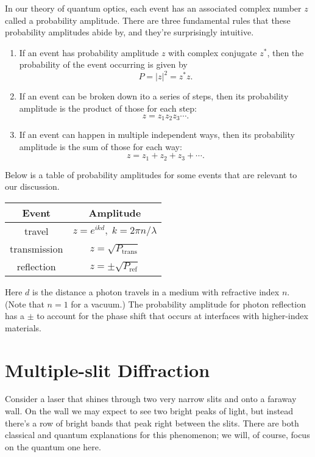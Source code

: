 \documentclass[../p051main.tex]{subfiles}
\begin{document}
In our theory of quantum optics, each event has an associated complex number $z$ called a probability amplitude.
There are three fundamental rules that these probability amplitudes abide by, and they're surprisingly intuitive.
\begin{enumerate}
    \item If an event has probability amplitude $z$ with complex conjugate $z^*$, then the probability of the event occurring is given by
    \[ P = |z|^2 = z^*z. \]

    \item If an event can be broken down ito a series of steps, then its probability amplitude is the product of those for each step:
    \[ z = z_1 z_2 z_3 \cdots. \]

    \item If an event can happen in multiple independent ways, then its probability amplitude is the sum of those for each way:
    \[ z = z_1 + z_2 + z_3 + \cdots. \]
\end{enumerate}
Below is a table of probability amplitudes for some events that are relevant to our discussion.
\begin{center}
    \def\arraystretch{1.3}
    \begin{tabular}{c|c}
        Event & Amplitude \\ \hline
        travel & $z = e^{ikd}, \;k = 2\pi n / \lambda$ \\
        transmission & $z = \sqrt{P_\textrm{trans}}$ \\
        reflection & $z = \pm \sqrt{P_\textrm{ref}}$
    \end{tabular}
\end{center}
Here $d$ is the distance a photon travels in a medium with refractive index $n$.
(Note that $n = 1$ for a vacuum.)
The probability amplitude for photon reflection has a $\pm$ to account for the phase shift that occurs at interfaces with higher-index materials.

\section{Multiple-slit Diffraction}
Consider a laser that shines through two very narrow slits and onto a faraway wall.
On the wall we may expect to see two bright peaks of light, but instead there's a row of bright bands that peak right between the slits.
There are both classical and quantum explanations for this phenomenon; we will, of course, focus on the quantum one here.
\end{document}
